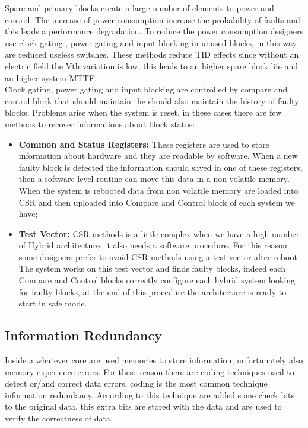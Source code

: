 {{{{		       Spare and primary blocks create a large number of elements to power and control. 
		       The increase of power consumption increase the probability of faults  and this leads a performance degradation. 
		       To reduce the power consumption designers use clock gating , power gating and input blocking in unused blocks, in this way are reduced useless switches. These methods reduce TID effects since without an electric field the Vth variation is low, this leads to an higher spare block life and an higher system MTTF.\\
		       
		       
		       Clock gating, power gating and input blocking are controlled by compare and control block that should maintain the should also maintain the history of faulty blocks. Problems arise when the system is reset, in these cases there are few methods to recover informations about block status:
		       \begin{itemize}
		           \item \textbf{Common and Status Registers:} These registers are used to store information about hardware and they are readable by software. When a new faulty block is detected the information should saved in one of these registers, then a software level routine can move this data in a non volatile memory. When the system is rebooted data from non volatile memory are loaded into CSR and then uploaded into Compare and Control block of each system we have;
		           \item \textbf{Test Vector:} CSR methods is a little complex when we have a high number of Hybrid architecture, it also needs a software procedure. For this reason some designers prefer to avoid CSR methods using a test vector after reboot  . The system works on this test vector and finds faulty blocks, indeed each Compare and Control blocks correctly configure each hybrid system looking for faulty blocks, at the end of this procedure the architecture is ready to start in safe mode.
		       \end{itemize}
		    }
		    
		}
		\subsection{Information Redundancy}{
			Inside a whatever core are used memories to store information, unfortunately also memory experience errors.
		    For these reason there are coding techniques used to detect or/and correct data errors, coding is the most common technique information redundancy. 
		    According to this technique are added some check bits to the original data, this extra bits are stored with the data and are used to verify the correctness of data.\\
		    
}}}

